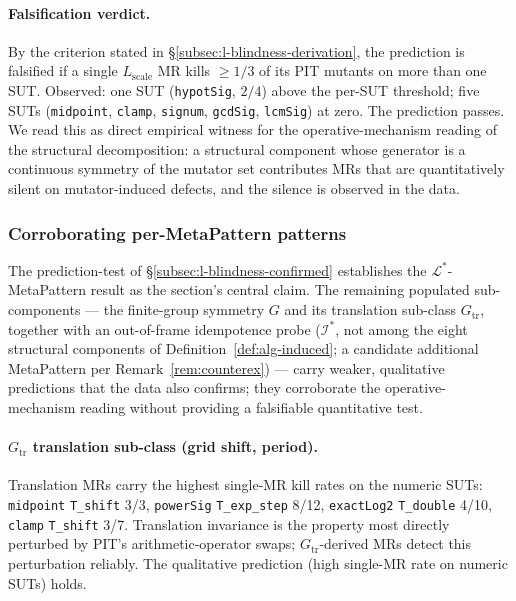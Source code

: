 \documentclass[acmsmall,screen,review]{acmart}
\begin{document}
\paragraph{Falsification verdict.}
By the criterion stated in \S\ref{subsec:l-blindness-derivation}, the
prediction is falsified if a single $L_{\mathrm{scale}}$ MR kills
$\ge 1/3$ of its PIT mutants on more than one SUT. Observed: one SUT
(\texttt{hypotSig}, $2/4$) above the per-SUT threshold; five SUTs
(\texttt{midpoint}, \texttt{clamp}, \texttt{signum}, \texttt{gcdSig},
\texttt{lcmSig}) at zero. The prediction passes. We read this as
direct empirical witness for the operative-mechanism reading of the
structural decomposition: a structural component whose generator is a continuous
symmetry of the mutator set contributes MRs that are quantitatively
silent on mutator-induced defects, and the silence is observed in
the data.

\subsubsection{Corroborating per-MetaPattern patterns}
\label{subsec:other-blocks}

The prediction-test of
\S\ref{subsec:l-blindness-confirmed} establishes the
$\mathcal{L}^{*}$-MetaPattern result as the section's central claim. The
remaining populated sub-components --- the finite-group symmetry $G$ and
its translation sub-class $G_{\mathrm{tr}}$, together with an
out-of-frame idempotence probe ($\mathcal{I}^{*}$, not among the eight
structural components of Definition~\ref{def:alg-induced}; a candidate additional MetaPattern
per Remark~\ref{rem:counterex}) --- carry weaker, qualitative
predictions that the data also confirms; they corroborate the
operative-mechanism reading without providing a falsifiable
quantitative test.

\paragraph{$G_{\mathrm{tr}}$ translation sub-class (grid shift, period).}
Translation MRs carry the highest single-MR kill rates on the numeric
SUTs: \texttt{midpoint} \texttt{T\_shift} 3/3, \texttt{powerSig}
\texttt{T\_exp\_step} 8/12, \texttt{exactLog2} \texttt{T\_double}
4/10, \texttt{clamp} \texttt{T\_shift} 3/7. Translation invariance is
the property most directly perturbed by PIT's arithmetic-operator
swaps; $G_{\mathrm{tr}}$-derived MRs detect this perturbation reliably. The
qualitative prediction (high single-MR rate on numeric SUTs) holds.
\end{document}
